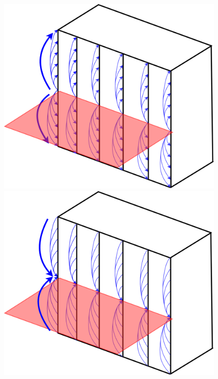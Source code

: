 \begin{frame}
\begin{multicols}{2}
\begin{figure}
\includegraphics[scale=0.4]{./Resources/Images/mapping23.png}
\\
\includegraphics[scale=0.4]{./Resources/Images/mapping32.png}

\end{figure}

\end{multicols}

\end{frame}


